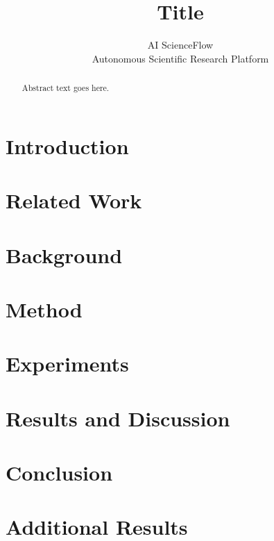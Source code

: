 \documentclass[10pt]{article}
\title{Title}
\author{
AI ScienceFlow \\
Autonomous Scientific Research Platform
}
\begin{document}
\maketitle

\begin{abstract}
Abstract text goes here.
\end{abstract}

\section{Introduction}

\section{Related Work}

\section{Background}

\section{Method}

\section{Experiments}

\section{Results and Discussion}

\section{Conclusion}




\appendix
\section{Additional Results}
\end{document}
